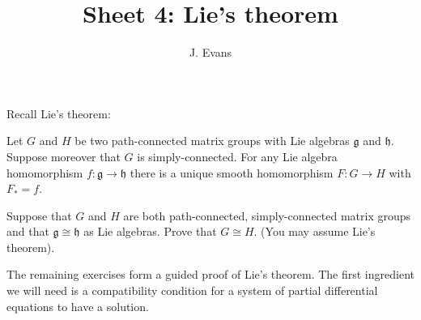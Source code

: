 \documentclass[12pt]{article}
\title{Sheet 4: Lie's theorem}
\author{J. Evans}
\date{}
\begin{document}
\maketitle

Recall Lie's theorem:
\begin{thm}[Lie]
Let $G$ and $H$ be two path-connected matrix groups with Lie algebras $\mathfrak{g}$ and $\mathfrak{h}$. Suppose moreover that $G$ is simply-connected. For any Lie algebra homomorphism $f\colon\mathfrak{g}\to\mathfrak{h}$ there is a unique smooth homomorphism $F\colon G\to H$ with $F_*=f$.
\end{thm}

\begin{question}
Suppose that $G$ and $H$ are both path-connected, simply-connected matrix groups and that $\mathfrak{g}\cong\mathfrak{h}$ as Lie algebras. Prove that $G\cong H$. (You may assume Lie's theorem).
\end{question}

\iffalse
\begin{answer}
Let $f\colon\mathfrak{g}\to\mathfrak{h}$ be an isomorphism of the Lie algebras. Since $G$ is connected and simply-connected and $H$ is connected, this exponentiates (by Lie's theorem) to a homomorphism $F\colon G\to H$. The inverse $f^{-1}$ also exponentiates to $\tilde{F}\colon H\to G$ since $H$ is also simply-connected. The composition $\tilde{F}\circ F$ has differential $f^{-1}\circ f=\OP{id}$ and by the uniqueness part of Lie's theorem it must itself be the identity. Therefore $\tilde{F}=F^{-1}$ and $F$ is an isomorphism.
\end{answer}
\fi


The remaining exercises form a guided proof of Lie's theorem. The first ingredient we will need is a compatibility condition for a system of partial differential equations to have a solution.
\end{document}
